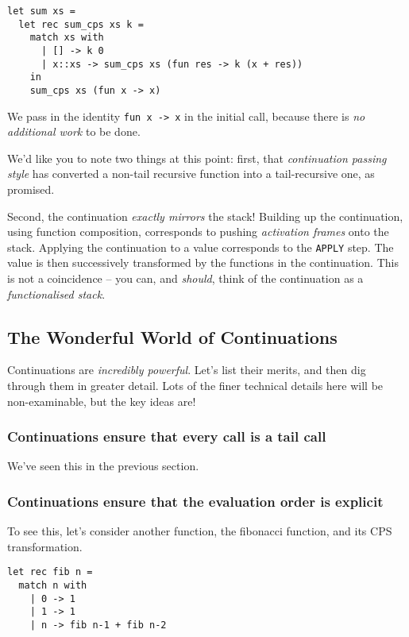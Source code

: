 \begin{code}
\label{code:sum-cps-wrapped-ocaml}
\begin{verbatim}
let sum xs = 
  let rec sum_cps xs k = 
    match xs with
      | [] -> k 0
      | x::xs -> sum_cps xs (fun res -> k (x + res))
    in
    sum_cps xs (fun x -> x)
\end{verbatim}
\end{code}

We pass in the identity \texttt{fun x -> x} in the initial call, because there is \emph{no additional work} to be done. 

We'd like you to note two things at this point: first, that \emph{continuation passing style} has converted a non-tail recursive function into a tail-recursive one, as promised. 

Second, the continuation \emph{exactly mirrors} the stack! Building up the continuation, using function composition, corresponds to pushing \emph{activation frames} onto the stack. Applying the continuation to a value corresponds to the \texttt{APPLY} step. The value is then successively transformed by the functions in the continuation. This is not a coincidence -- you can, and \emph{should}, think of the continuation as a \emph{functionalised stack}. 

\subsection{The Wonderful World of Continuations}
Continuations are \emph{incredibly powerful}. Let's list their merits, and then dig through them in greater detail. Lots of the finer technical details here will be non-examinable, but the key ideas are!

\subsubsection{Continuations ensure that every call is a tail call}
We've seen this in the previous section.


\subsubsection{Continuations ensure that the evaluation order is explicit}
To see this, let's consider another function, the fibonacci function, and its CPS transformation. 

\begin{code}
\label{code:fib-ocaml-again}
\begin{verbatim}
let rec fib n = 
  match n with
    | 0 -> 1
    | 1 -> 1
    | n -> fib n-1 + fib n-2
\end{verbatim}
\end{code}

